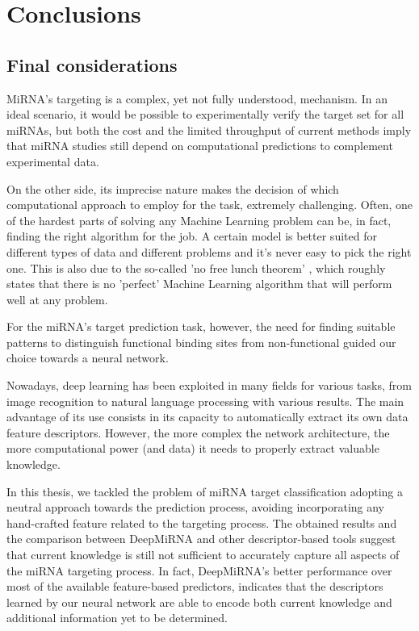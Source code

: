 
\chapter{Conclusions} %

\label{Chapter7} %

\section{Final considerations}
MiRNA's targeting is a complex, yet not fully understood, mechanism. In an ideal scenario, it would be possible to experimentally verify the target set for all miRNAs, but both the cost and the limited throughput of current methods imply that miRNA studies still depend on computational predictions to complement experimental data.

On the other side, its imprecise nature makes the decision of which computational approach to employ for the task, extremely challenging. Often, one of the hardest parts of solving any Machine Learning problem can be, in fact, finding the right algorithm for the job. A certain model is better suited for different types of data and different problems and it's never easy to pick the right one. This is also due to the so-called 'no free lunch theorem' \cite{nfl}, which roughly states that there is no 'perfect' Machine Learning algorithm that will perform well at any problem.

For the miRNA's target prediction task, however, the need for finding suitable patterns to distinguish functional binding sites from non-functional guided our choice towards a neural network. 

Nowadays, deep learning has been exploited in many fields for various tasks, from image recognition to natural language processing with various results. The main advantage of its use consists in its capacity to automatically extract its own data feature descriptors. However, the more complex the network architecture, the more computational power (and data) it needs to properly extract valuable knowledge.

In this thesis, we tackled the problem of miRNA target classification adopting a neutral approach towards the prediction process, avoiding incorporating any hand-crafted feature related to the targeting process. The obtained results and the comparison between DeepMiRNA and other descriptor-based tools suggest that current knowledge is still not sufficient to accurately capture all aspects of the miRNA targeting process. In fact, DeepMiRNA's better performance over most of the available feature-based predictors, indicates that the descriptors learned by our neural network are able to encode both current knowledge and additional information yet to be determined.   

